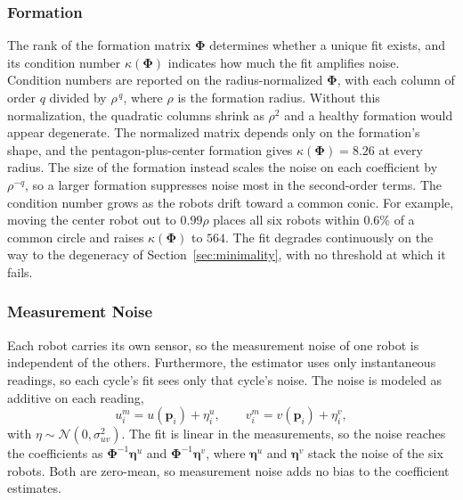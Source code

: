 \documentclass[lettersize,journal]{IEEEtran}
\begin{document}
\subsubsection{Formation}
The rank of the formation matrix $\boldsymbol{\Phi}$ determines whether
a unique fit exists, and its condition number $\kappa(\boldsymbol{\Phi})$
indicates how much the fit amplifies noise. Condition numbers are
reported on the radius-normalized $\boldsymbol{\Phi}$, with each column
of order $q$ divided by $\rho^{\,q}$, where $\rho$ is the formation radius. Without this normalization, the
quadratic columns shrink as $\rho^{2}$ and a healthy formation would
appear degenerate. The normalized matrix depends only on the formation's
shape, and the pentagon-plus-center formation gives
$\kappa(\boldsymbol{\Phi}) = 8.26$ at every radius. The size of the formation instead scales the noise on each
coefficient by $\rho^{-q}$, so a larger formation suppresses noise most
in the second-order terms. The condition number grows as the robots
drift toward a common conic. For example, moving the center robot out
to $0.99\rho$ places all six robots within $0.6\%$ of a common circle
and raises $\kappa(\boldsymbol{\Phi})$ to $564$. The fit degrades
continuously on the way to the degeneracy of
Section~\ref{sec:minimality}, with no threshold at which it fails.

\subsubsection{Measurement Noise}
Each robot carries its own sensor, so the measurement noise of one robot
is independent of the others. Furthermore, the estimator uses only
instantaneous readings, so each cycle's fit sees only that cycle's
noise. The noise is modeled as additive on each reading,
\begin{equation}
    u_i^m = u(\mathbf{p}_i) + \eta_i^u, \qquad
    v_i^m = v(\mathbf{p}_i) + \eta_i^v,
    \label{eq:meas_noise}
\end{equation}
with $\eta \sim \mathcal{N}(0, \sigma_{uv}^2)$. The fit is linear in the
measurements, so the noise reaches the coefficients as
$\boldsymbol{\Phi}^{-1}\boldsymbol{\eta}^u$ and
$\boldsymbol{\Phi}^{-1}\boldsymbol{\eta}^v$, where $\boldsymbol{\eta}^u$
and $\boldsymbol{\eta}^v$ stack the noise of the six robots. Both are
zero-mean, so measurement noise adds no bias to the coefficient estimates.
\end{document}
